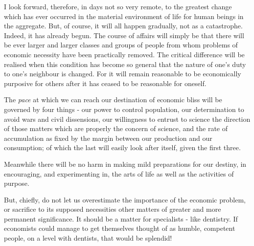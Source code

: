 I look forward, therefore, in days not so very remote, to the greatest change which has ever occurred in the material environment of life for human beings in the aggregate. But, of course, it will all happen gradually, not as a catastrophe. Indeed, it has already begun. The course of affairs will simply be that there will be ever larger and larger classes and groups of people from whom problems of economic necessity have been practically removed. The critical difference will be realised when this condition has become so general that the nature of one’s duty to one’s neighbour is changed. For it will remain reasonable to be economically purposive for others after it has ceased to be reasonable for oneself.\par

The \textit{pace} at which we can reach our destination of economic bliss will be governed by four things - our power to control population, our determination to avoid wars and civil dissensions, our willingness to entrust to science the direction of those matters which are properly the concern of science, and the rate of accumulation as fixed by the margin between our production and our consumption; of which the last will easily look after itself, given the first three.\par

Meanwhile there will be no harm in making mild preparations for our destiny, in encouraging, and experimenting in, the arts of life as well as the activities of purpose.\par

But, chiefly, do not let us overestimate the importance of the economic problem, or sacrifice to its supposed necessities other matters of greater and more permanent significance. It should be a matter for specialists - like dentistry. If economists could manage to get themselves thought of as humble, competent people, on a level with dentists, that would be splendid!\par

\endgroup
